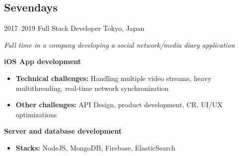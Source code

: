 \documentclass[]{template/friggeri-cv} %
\begin{document}
\subsection{Sevendays}
\begin{entrylist}


\entry
{2017--2019}
{Full Stack Developer}
{Tokyo, Japan}
{\emph{Full time in a company developing a social network/media diary application}

\textbf{iOS App development} 
\begin{itemize}
\item \textbf{Technical challenges:} Handling multiple video streams, heavy multithreading, real-time network synchronization
\item \textbf{Other challenges:} API Design, product development, CR, UI/UX optimizations
\end{itemize}
\textbf{Server and database development} 
\begin{itemize}
\item \textbf{Stacks:} NodeJS, MongoDB, Firebase, ElasticSearch

\end{itemize}


}
\end{entrylist}
\end{document}
